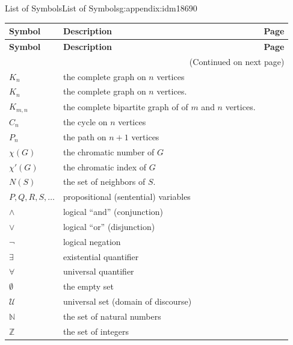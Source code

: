 \documentclass[oneside,10pt,]{book}
\numberwithin{equation}{chapter}
\def\N{\mathbb N}
\def\Z{\mathbb Z}
\def\U{\mathcal U}
\begin{document}
\begin{appendixptx}{List of Symbols}{}{List of Symbols}{}{}{g:appendix:idm18690}
\begin{longtable}[l]{lp{}r}
\addtocounter{table}{-1}
\textbf{Symbol}&\textbf{Description}&\textbf{Page}\\[1em]
\endfirsthead
\textbf{Symbol}&\textbf{Description}&\textbf{Page}\\[1em]
\endhead
\multicolumn{3}{r}{(Continued on next page)}\\
\endfoot
\endlastfoot
\(K_n\)&the complete graph on \(n\) vertices&\pageref{g:notation:idm9052}\\
\(K_n\)&the complete graph on \(n\) vertices.&\pageref{g:notation:idm9105}\\
\(K_{m,n}\)&the complete bipartite graph of of \(m\) and \(n\) vertices.&\pageref{g:notation:idm9115}\\
\(C_n\)&the cycle on \(n\) vertices&\pageref{g:notation:idm9125}\\
\(P_n\)&the path on \(n+1\) vertices&\pageref{g:notation:idm9135}\\
\(\chi(G)\)&the chromatic number of \(G\)&\pageref{g:notation:idm10612}\\
\(\chi'(G)\)&the chromatic index of \(G\)&\pageref{g:notation:idm11001}\\
\(N(S)\)&the set of neighbors of \(S\).&\pageref{g:notation:idm11248}\\
\(
                    P, Q, R, S, \ldots
                \)&propositional (sentential) variables&\pageref{g:notation:idm12087}\\
\(\wedge\)&logical ``and'' (conjunction)&\pageref{g:notation:idm12110}\\
\(\vee\)&logical ``or'' (disjunction)&\pageref{g:notation:idm12125}\\
\(\neg\)&logical negation&\pageref{g:notation:idm12170}\\
\(\exists\)&existential quantifier&\pageref{g:notation:idm12640}\\
\(\forall\)&universal quantifier&\pageref{g:notation:idm12653}\\
\(\emptyset\)&the empty set&\pageref{g:notation:idm13092}\\
\(\U\)&universal set (domain of discourse)&\pageref{g:notation:idm13102}\\
\(\N\)&the set of natural numbers&\pageref{g:notation:idm13110}\\
\(\Z\)&the set of integers&\pageref{g:notation:idm13122}\\

\end{longtable}
\end{appendixptx}
\end{document}
